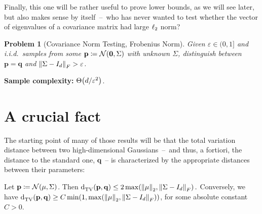\documentclass[10pt]{article}
\newcommand{\dst}{\varepsilon}
\newcommand{\dims}{d}
\newcommand{\p}{\mathbf{p}}
\newcommand{\q}{\mathbf{q}}
\renewcommand{\eqdef}{\coloneqq}
\theoremstyle{plain}
\newtheorem{problem}[theorem]{Problem}
\begin{document}
Finally, this one will be rather useful to prove lower bounds, as we will see later, but also makes sense by itself~--~who has never wanted to test whether the vector of eigenvalues of a covariance matrix had large $\lp[2]$ norm?
\begin{problem}[Covariance Norm Testing, Frobenius Norm]
  \label{problem:cov:test:norm:frob}
  Given $\dst \in(0,1]$ and i.i.d.\ samples from some $\p\eqdef\gaussian{\mathbf{0}}{\Sigma}$ with unknown $\Sigma$, distinguish between $\p=\q$ and $\norm{\Sigma-I_\dims}_{F}>\dst$.
\end{problem}
\hfill \textbf{Sample complexity:} $\bigTheta{\dims/\dst^2}$. 

\section{A crucial fact}
The starting point of many of those results will be that the total variation distance between two high-dimensional Gaussians~--~and thus, a fortiori, the distance to the standard one, $\q$~-- is characterized by the appropriate distances between their parameters:
\begin{fact}
  \label{fact:tv:parameters}
  Let $\p\eqdef\gaussian{\mu}{\Sigma}$. Then
  $
      \totalvardist{\p}{\q} \leq 2\max\mleft(  \normtwo{\mu}, \norm{\Sigma-I_\dims}_F \mright)\,.
  $
  Conversely, we have $\totalvardist{\p}{\q} \geq C\min(1,\max\mleft(  \normtwo{\mu}, \norm{\Sigma-I_\dims}_F \mright))$, for some absolute constant $C>0$.
\end{fact}
\end{document}
